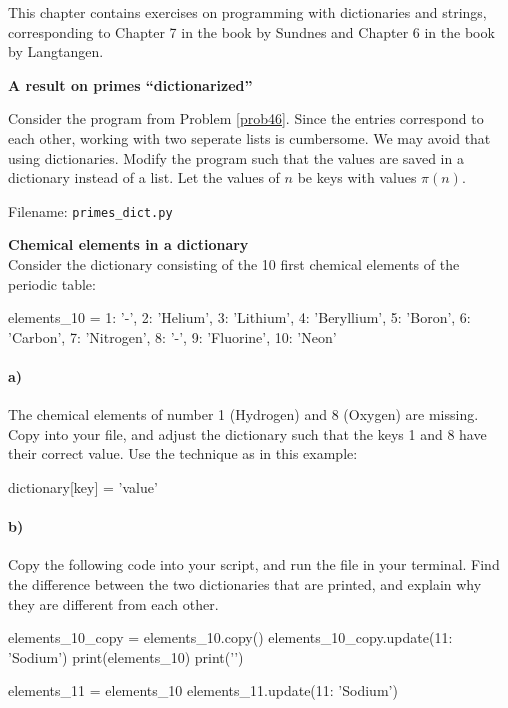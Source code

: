 This chapter contains exercises on programming with dictionaries and strings,
corresponding to Chapter 7 in the book by Sundnes and Chapter 6 in the book by Langtangen.


\begin{Problem}{\textbf{A result on primes ``dictionarized''}} \label{prob61}

\noindent Consider the program from Problem \ref{prob46}. Since the entries correspond to each other,
working with two seperate lists is cumbersome. We may avoid that using dictionaries.
Modify the program such that the values are saved in a dictionary instead of a list.
Let the values of $n$ be keys with values $\pi(n)$.

Filename: \texttt{primes\_dict.py}
\end{Problem}

\begin{Problem}\textbf{Chemical elements in a dictionary}
\noindent\\
Consider the dictionary  consisting of the 10 first chemical elements of the periodic table:
\begin{python}
elements_10 = {1: '-', 2: 'Helium', 3: 'Lithium',
         4: 'Beryllium', 5: 'Boron', 6: 'Carbon',
         7: 'Nitrogen', 8: '-',
         9: 'Fluorine', 10: 'Neon'}
\end{python}
\paragraph{a)}
The chemical elements of number 1 (Hydrogen) and 8 (Oxygen) are missing. Copy  into your file, and adjust the dictionary such that the keys 1 and 8 have their correct value. Use the technique as in this example:
\begin{python}
dictionary[key] = 'value'
\end{python}
\paragraph{b)}
Copy the following code into your script, and run the file in your terminal. Find the difference between the two dictionaries that are printed, and explain why they are different from each other.
\begin{python}
elements_10_copy = elements_10.copy()
elements_10_copy.update({11: 'Sodium'})
print(elements_10)
print('\n')

elements_11 = elements_10
elements_11.update({11: 'Sodium'})
print(elements_10)
\end{python}

Filename: \texttt{chemical\_elements\_dict.py}
\end{Problem}



